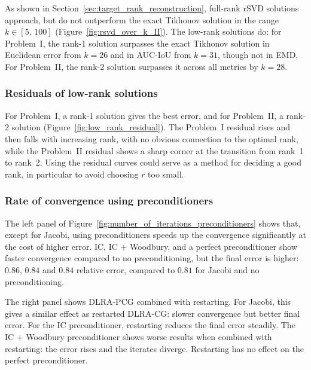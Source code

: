 As shown in Section~\ref{sec:target_rank_reconstruction}, full-rank rSVD solutions approach, but do not outperform the exact Tikhonov solution in the range $k \in [5,\,100]$ (Figure~\ref{fig:rsvd_over_k_II}). The low-rank solutions do: for Problem~I, the rank-1 solution surpasses the exact Tikhonov solution in Euclidean error from $k = 26$ and in AUC-IoU from $k = 31$, though not in EMD. For Problem~II, the rank-2 solution surpasses it across all metrics by $k = 28$.


\subsubsection{Residuals of low-rank solutions}\label{sec:residuals_of_low_rank_solutions}

For Problem~I, a rank-1 solution gives the best error, and for Problem~II, a rank-2 solution (Figure~\ref{fig:low_rank_residual}). The Problem~I residual rises and then falls with increasing rank, with no obvious connection to the optimal rank, while the Problem~II residual shows a sharp corner at the transition from rank~1 to rank~2. Using the residual curves could serve as a method for deciding a good rank, in particular to avoid choosing $r$ too small.


\subsubsection{Rate of convergence using preconditioners}\label{sec:rate_of_convergence_using_preconditioners}


The left panel of Figure~\ref{fig:number_of_iterations_preconditioners} shows that, except for Jacobi, using preconditioners speeds up the convergence significantly at the cost of higher error. IC, IC + Woodbury, and a perfect preconditioner show faster convergence compared to no preconditioning, but the final error is higher: $0.86$, $0.84$ and $0.84$ relative error, compared to $0.81$ for Jacobi and no preconditioning.

The right panel shows DLRA-PCG combined with restarting. For Jacobi, this gives a similar effect as restarted DLRA-CG: slower convergence but better final error. For the IC preconditioner, restarting reduces the final error steadily. The IC + Woodbury preconditioner shows worse results when combined with restarting: the error rises and the iterates diverge. Restarting has no effect on the perfect preconditioner.

